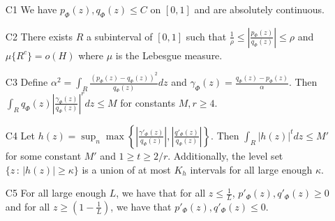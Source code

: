 \documentclass{article}
\begin{document}
\begin{proposition}
\begin{enumerate}
\item[C1] We have $p_\Phi(z), q_\Phi(z) \leq C$ on $[0,1]$ and are absolutely continuous.
\item[C2] There exists $R$ a subinterval of $[0,1]$ such that $\frac{1}{\rho} \leq \left| \frac{p_\Phi(z)}{q_\Phi(z)} \right| \leq \rho$ and $\mu\{R^c\} = o(H)$ where $\mu$ is the Lebesgue measure.
\item[C3] Define $\alpha^2 = \int_R \frac{(p_\Phi(z) - q_\Phi(z))^2}{q_\Phi(z)} dz$ and $\gamma_\Phi(z) = \frac{q_\Phi(z) - p_\Phi(z)}{\alpha}$. Then $\int_R q_\Phi(z) \left| \frac{\gamma_\Phi(z)}{q_\Phi(z)} \right|^r dz  \leq M$ for constants $M, r \geq 4$.
\item[C4] Let $h(z) = \sup_n \max \left\{  \left|\frac{\gamma'_\Phi(z)}{q_\Phi(z)} \right|, 
 \left|\frac{q'_\Phi(z)}{q_\Phi(z)}\right|  \right\} $. Then $\int_R |h(z)|^t dz \leq M'$ for some constant $M'$ and $1 \geq t \geq 2/r$. Additionally, the level set $\{z \,:\, |h(z)| \geq \kappa\}$ is a union of at most $K_h$ intervals for all large enough $\kappa$.  
\item[C5] For all large enough $L$, we have that for all $z \leq \frac{1}{L}$, $p'_\Phi(z), q'_\Phi(z) \geq 0$ and for all $z \geq (1 - \frac{1}{L})$, we have that $p'_\Phi(z), q'_\Phi(z) \leq 0$.
\end{enumerate}

\end{proposition}
\end{document}
